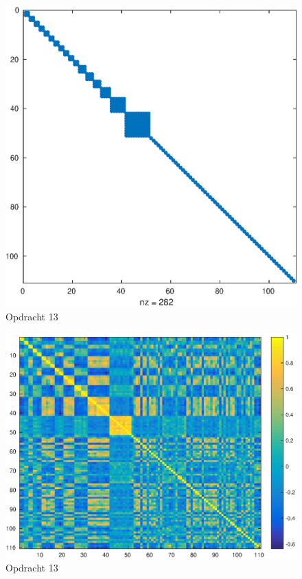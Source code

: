 \documentclass[11pt,a4paper]{article}
\begin{document}
\begin{figure}[H]
\centering
\includegraphics[scale=0.65]{opdracht13a}
\caption{Opdracht 13}
\end{figure}

\begin{figure}[H]
\centering
\includegraphics[scale=0.55]{opdracht13b}
\caption{Opdracht 13}
\end{figure}
\end{document}
